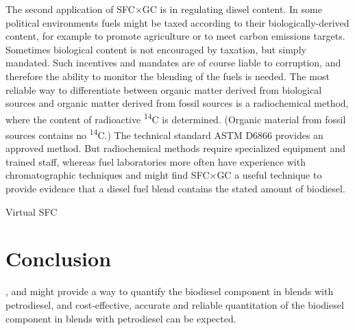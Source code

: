 The second application of SFC×GC is in regulating diesel content. In some
political environments fuels might be taxed according to their
biologically-derived content, for example to promote agriculture or to meet
carbon emissions targets. Sometimes biological content is not encouraged by
taxation, but simply mandated. Such incentives and mandates are of course liable
to corruption, and therefore the ability to monitor the blending of the fuels is
needed. The most reliable way to differentiate between organic matter derived
from biological sources and organic matter derived from fossil sources is a
radiochemical method, where the content of radioactive \textsuperscript{14}C is
determined. (Organic material from fossil sources contains no
\textsuperscript{14}C.) The technical standard ASTM D6866 provides an approved
method. But radiochemical methods require specialized equipment and trained
staff, whereas fuel laboratories more often have experience with chromatographic
techniques and might find SFC×GC a useful technique to provide evidence that a
diesel fuel blend contains the stated amount of biodiesel.
\begin{todo}Virtual SFC\end{todo}

\section{Conclusion}


, and might provide a way to quantify the biodiesel component in blends
with petrodiesel, and cost-effective, accurate and reliable quantitation of the
biodiesel component in blends with petrodiesel can be expected.



\todos